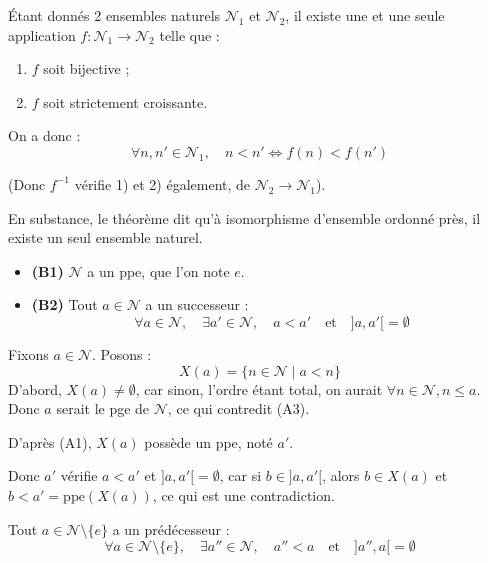 \documentclass[a4paper,11pt]{article}
\begin{document}
\begin{theoreme}[Admis]
Étant donnés 2 ensembles naturels $\mathcal{N}_1$ et $\mathcal{N}_2$, il existe une et une seule application $f : \mathcal{N}_1 \to \mathcal{N}_2$ telle que :
\begin{enumerate}
    \item $f$ soit bijective ;
    \item $f$ soit strictement croissante.
\end{enumerate}
On a donc :
\[
\forall n, n' \in \mathcal{N}_1, \quad n < n' \iff f(n) < f(n')
\]
\end{theoreme}

(Donc $f^{-1}$ vérifie 1) et 2) également, de $\mathcal{N}_2 \to \mathcal{N}_1$).

\begin{remarque}
En substance, le théorème dit qu'à isomorphisme d'ensemble ordonné près, il existe un seul ensemble naturel.
\end{remarque}

\begin{proposition}
\begin{itemize}
    \item \textbf{(B1)} $\mathcal{N}$ a un ppe, que l'on note $e$.
    \item \textbf{(B2)} Tout $a \in \mathcal{N}$ a un successeur :
    \[
    \forall a \in \mathcal{N}, \quad \exists a' \in \mathcal{N}, \quad a < a' \quad \text{et} \quad ]a, a'[ = \emptyset
    \]
\end{itemize}
\end{proposition}

\begin{demonstration}
Fixons $a \in \mathcal{N}$. Posons :
\[
X(a) = \{ n \in \mathcal{N} \mid a < n \}
\]
D'abord, $X(a) \neq \emptyset$, car sinon, l'ordre étant total, on aurait $\forall n \in \mathcal{N}, n \le a$. Donc $a$ serait le pge de $\mathcal{N}$, ce qui contredit (A3).

D'après (A1), $X(a)$ possède un ppe, noté $a'$.

Donc $a'$ vérifie $a < a'$ et $]a, a'[ = \emptyset$, car si $b \in ]a, a'[$, alors $b \in X(a)$ et $b < a' = \text{ppe}(X(a))$, ce qui est une contradiction.
\end{demonstration}

\begin{proposition}[(B3)]
Tout $a \in \mathcal{N} \setminus \{e\}$ a un prédécesseur :
\[
\forall a \in \mathcal{N} \setminus \{e\}, \quad \exists a'' \in \mathcal{N}, \quad a'' < a \quad \text{et} \quad ]a'', a[ = \emptyset
\]
\end{proposition}
\end{document}
